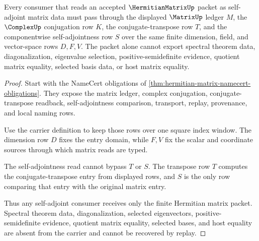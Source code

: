 \begin{theorem}
\label{thm:hermitian-matrix-self-adjointness-boundary}
Every consumer that reads an accepted $\HermitianMatrixUp$ packet as self-adjoint matrix data must pass through the displayed $\MatrixUp$ ledger $M$, the $\ComplexUp$ conjugation row $K$, the conjugate-transpose row $T$, and the componentwise self-adjointness row $S$ over the same finite dimension, field, and vector-space rows $D,F,V$. The packet alone cannot export spectral theorem data, diagonalization, eigenvalue selection, positive-semidefinite evidence, quotient matrix equality, selected basis data, or host matrix equality.
\end{theorem}
\begin{proof}
Start with the NameCert obligations of \autoref{thm:hermitian-matrix-namecert-obligations}. They expose the matrix ledger, complex conjugation, conjugate-transpose readback, self-adjointness comparison, transport, replay, provenance, and local naming rows.

Use the carrier definition to keep those rows over one square index window. The dimension row $D$ fixes the entry domain, while $F,V$ fix the scalar and coordinate sources through which matrix reads are typed.

The self-adjointness read cannot bypass $T$ or $S$. The transpose row $T$ computes the conjugate-transpose entry from displayed rows, and $S$ is the only row comparing that entry with the original matrix entry.

Thus any self-adjoint consumer receives only the finite Hermitian matrix packet. Spectral theorem data, diagonalization, selected eigenvectors, positive-semidefinite evidence, quotient matrix equality, selected bases, and host equality are absent from the carrier and cannot be recovered by replay.
\end{proof}

\begin{closurestatus}{\HermitianMatrixUp}
  \theoryclosure{\seedClosure}
  \formalstatus{\unformalizedV}
\end{closurestatus}

